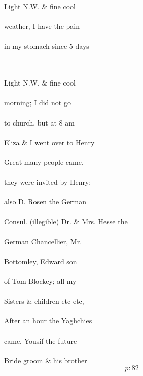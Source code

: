 \documentclass{report}
\begin{document}
	\par{
 	Light N.W. \& fine cool\ \\\ \\weather, I have the pain\ \\\ \\in my stomach since 5 days\ \\\ \\\ \\
	}

	\par{
 	Light N.W. \& fine cool\ \\\ \\morning; I did not go\ \\\ \\to church, but at 8 am\ \\\ \\Eliza \& I went over to Henry\ \\\ \\Great many people came,\ \\\ \\they were invited by Henry;\ \\\ \\also D. Rosen the German\ \\\ \\Consul. (illegible) Dr. \& Mrs. Hesse the\ \\\ \\German Chancellier, Mr.\ \\\ \\Bottomley, Edward son\ \\\ \\of Tom Blockey; all my\ \\\ \\Sisters \& children etc etc,\ \\\ \\After an hour the Yaghchies\ \\\ \\came, Yousif the future\ \\\ \\Bride groom \& his brother\ \\
  \[p: 82 \]

	}
\end{document}
